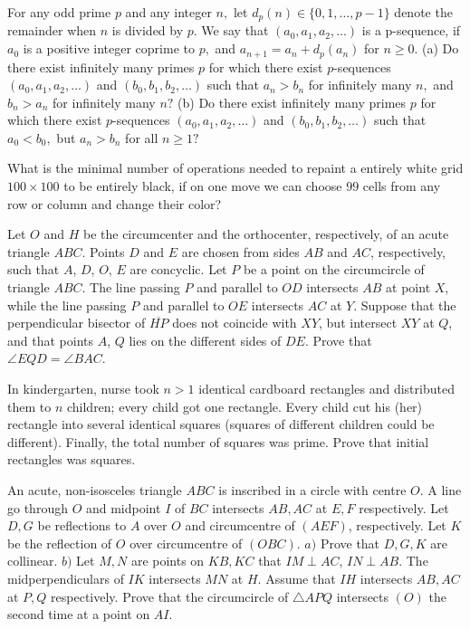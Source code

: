 \documentclass[11pt]{scrartcl}
\begin{document}
\begin{problem}[522990139281725]
	For any odd prime $p$ and any integer $n,$ let $d_p (n) \in \{ 0,1, \dots, p-1 \}$ denote the remainder when $n$ is divided by $p.$ We say that $(a_0, a_1, a_2, \dots)$ is a p-sequence, if $a_0$ is a positive integer coprime to $p,$ and $a_{n+1} =a_n + d_p (a_n)$ for $n \geqslant 0.$
(a) Do there exist infinitely many primes $p$ for which there exist $p$-sequences $(a_0, a_1, a_2, \dots)$ and $(b_0, b_1, b_2, \dots)$ such that $a_n >b_n$ for infinitely many $n,$ and $b_n > a_n$ for infinitely many $n?$
(b) Do there exist infinitely many primes $p$ for which there exist $p$-sequences $(a_0, a_1, a_2, \dots)$ and $(b_0, b_1, b_2, \dots)$ such that $a_0 <b_0,$ but $a_n >b_n$ for all $n \geqslant 1?$
\end{problem}
\begin{problem}[549441013338848]
	What is the minimal number of operations needed to repaint a entirely white grid $100 \times 100$ to be entirely black, if on one move we can choose $99$ cells from any row or column and change their color?
\end{problem}
\begin{problem}[457324036151847]
Let $O$ and $H$ be the circumcenter and the orthocenter, respectively, of an acute triangle $ABC$. Points $D$ and $E$ are chosen from sides $AB$ and $AC$, respectively, such that $A$, $D$, $O$, $E$ are concyclic. Let $P$ be a point on the circumcircle of triangle $ABC$. The line passing $P$ and parallel to $OD$ intersects $AB$ at point $X$, while the line passing $P$ and parallel to $OE$ intersects $AC$ at $Y$. Suppose that the perpendicular bisector of $\overline{HP}$ does not coincide with $XY$, but intersect $XY$ at $Q$, and that points $A$, $Q$ lies on the different sides of $DE$. Prove that $\angle EQD = \angle BAC$.
\end{problem}
\begin{problem}[181463134716189]
	In kindergarten, nurse took $n>1$ identical cardboard rectangles and distributed them to $n$ children; every child got one rectangle. Every child cut his (her) rectangle into several identical squares (squares of different children could be different). Finally, the total number of squares was prime. Prove that initial rectangles was squares.
\end{problem}
\begin{problem}[796349431725149]
An acute, non-isosceles triangle $ABC$ is inscribed in a circle with centre $O$. A line go through $O$ and midpoint $I$ of $BC$ intersects $AB, AC$ at $E, F$ respectively. Let $D, G$ be reflections to $A$ over $O$ and circumcentre of $(AEF)$, respectively. Let $K$ be the reflection of $O$ over circumcentre of $(OBC)$.
$a)$ Prove that $D, G, K$ are collinear.
$b)$ Let $M, N$ are points on $KB, KC$ that $IM\perp AC$, $IN\perp AB$. The midperpendiculars of $IK$ intersects $MN$ at $H$. Assume that $IH$ intersects $AB, AC$ at $P, Q$ respectively. Prove that the circumcircle of $\triangle APQ$ intersects $(O)$ the second time at a point on $AI$.
\end{problem}
\end{document}
